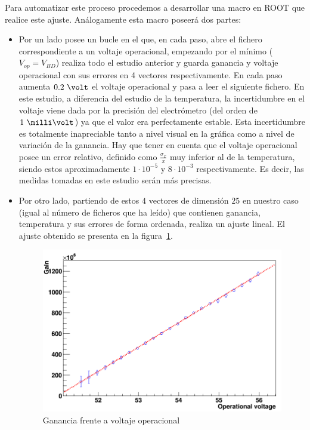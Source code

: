 Para automatizar este proceso procedemos a desarrollar una macro en ROOT que realice este ajuste. Análogamente esta macro poseerá dos partes:
\begin{itemize}
\item{} Por un lado posee un bucle en el que, en cada paso, abre el fichero correspondiente a un voltaje operacional, empezando por el mínimo ($V_{op}=V_{BD}$) realiza todo el estudio anterior y guarda ganancia y voltaje operacional con sus errores en 4 vectores respectivamente. En cada paso aumenta $0.2~\volt$ el voltaje operacional y pasa a leer el siguiente fichero. 
En este estudio, a diferencia del estudio de la temperatura, la incertidumbre en el voltaje viene dada por la precisión del electrómetro (del orden de $1~\milli\volt$) ya que el valor era perfectamente estable. Esta incertidumbre es  totalmente inapreciable tanto a nivel visual en la gráfica como a nivel de variación de la ganancia. 
Hay que tener en cuenta que el voltaje operacional posee un error relativo, definido como $\frac{\sigma_x}{x}$ muy inferior al de la temperatura, siendo estos aproximadamente $1 \cdot 10^{-5}$ y $8 \cdot 10^{-3}$ respectivamente. Es decir, las medidas tomadas en este estudio serán más precisas.

\item {} Por otro lado, partiendo de estos $4$ vectores de dimensión $25$ en nuestro caso (igual al número de ficheros que ha leído) que contienen ganancia, temperatura y sus errores de forma ordenada, realiza un ajuste lineal. El ajuste obtenido se presenta en la figura~\ref{voltaje}.

\begin{figure}[hbtp]
\centering
\includegraphics[scale=0.4]{Dependenciavoltaje.png}
\caption{ Ganancia frente a voltaje operacional\label{voltaje}}
\end{figure}


\end{itemize}
